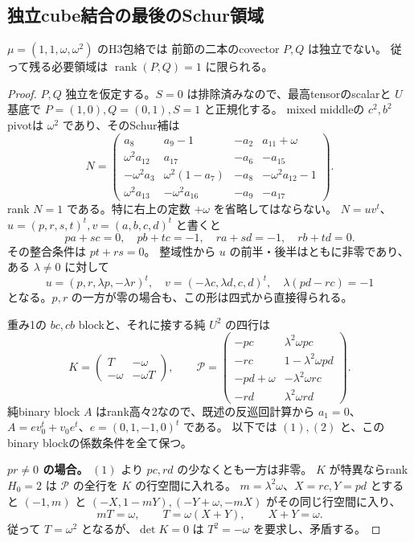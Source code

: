 \subsection{独立cube結合の最後のSchur領域}
\label{subsec:cubic-third-root-unit-independent-Snonzero}
\begin{theorem}[重複1では二つのcube結合は比例する]
\label{thm:cubic-third-root-unit-independent-couplings-empty}
$\mu=(1,1,\omega,\omega^2)$ のH3包絡では
前節の二本のcovector $P,Q$ は独立でない。
従って残る必要領域は $\operatorname{rank}(P,Q)=1$ に限られる。
\end{theorem}
\begin{proof}
$P,Q$ 独立を仮定する。$S=0$ は排除済みなので、最高tensorのscalarと $U$ 基底で
$P=(1,0),Q=(0,1),S=1$ と正規化する。
mixed middleの $c^2,b^2$ pivotは $\omega^2$ であり、そのSchur補は
\[
 N=\begin{pmatrix}
 a_8&a_9-1&-a_2&a_{11}+\omega\\
 \omega^2a_{12}&a_{17}&-a_6&-a_{15}\\
 -\omega^2a_3&\omega^2(1-a_7)&-a_8&-\omega^2a_{12}-1\\
 \omega^2a_{13}&-\omega^2a_{16}&-a_9&-a_{17}
 \end{pmatrix}.
\]
rank $N=1$ である。特に右上の定数 $+\omega$ を省略してはならない。
$N=uv^t$、$u=(p,r,s,t)^t,v=(a,b,c,d)^t$ と書くと
\[
 pa+sc=0,\quad pb+tc=-1,\quad ra+sd=-1,\quad rb+td=0.
\]
その整合条件は $pt+rs=0$。
整域性から $u$ の前半・後半はともに非零であり、ある $\lambda\ne0$ に対して
\[
 u=(p,r,\lambda p,-\lambda r)^t,\quad
 v=(-\lambda c,\lambda d,c,d)^t,\quad
 \lambda(pd-rc)=-1
\tag{1}
\]
となる。$p,r$ の一方が零の場合も、この形は四式から直接得られる。

重み1の $bc,cb$ blockと、それに接する純 $U^2$ の四行は
\[
 K=\begin{pmatrix}T&-\omega\\-\omega&-\omega T\end{pmatrix},\qquad
 \mathcal P=\begin{pmatrix}
 -pc&\lambda^2\omega pc\\
 -rc&1-\lambda^2\omega pd\\
 -pd+\omega&-\lambda^2\omega rc\\
 -rd&\lambda^2\omega rd
 \end{pmatrix}.
\tag{2}
\]
純binary block $A$ はrank高々2なので、既述の反巡回計算から $a_1=0$、
$A=ev_0^t+v_0e^t$、$e=(0,1,-1,0)^t$ である。
以下では $(1),(2)$ と、このbinary blockの係数条件を全て保つ。

\textbf{$pr\ne0$ の場合。}
$(1)$ より $pc,rd$ の少なくとも一方は非零。
$K$ が特異ならrank $H_0=2$ は $\mathcal P$ の全行を $K$ の行空間に入れる。
$m=\lambda^2\omega$、$X=rc,Y=pd$ とすると
$(-1,m)$ と $(-X,1-mY),(-Y+\omega,-mX)$ がその同じ行空間に入り、
\[
 mT=\omega,\qquad T=\omega(X+Y),\qquad X+Y=\omega.
\]
従って $T=\omega^2$ となるが、$\det K=0$ は $T^2=-\omega$ を要求し、矛盾する。


\end{proof}

